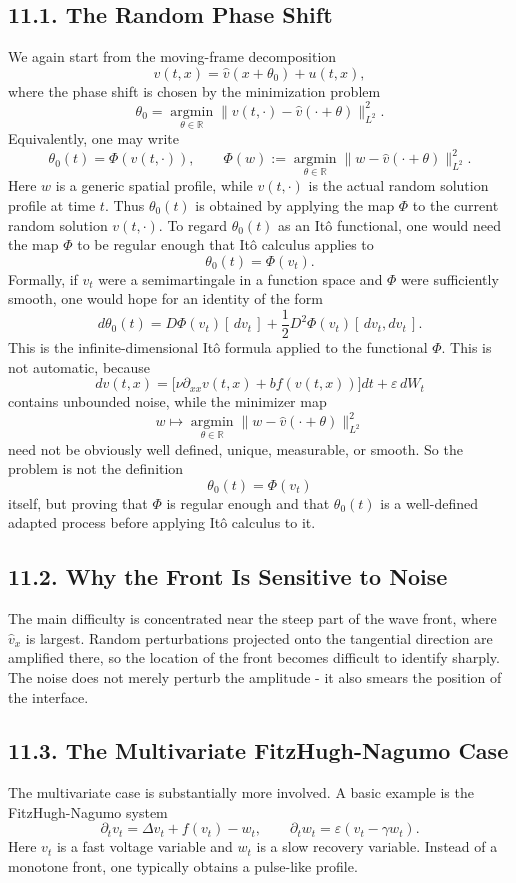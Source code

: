 \documentclass[11pt]{article}
\theoremstyle{definition}
\theoremstyle{remark}
\begin{document}
\subsection*{11.1. The Random Phase Shift}
We again start from the moving-frame decomposition
\[
v(t,x)=\hat v(x+\theta_0)+u(t,x),
\]
where the phase shift is chosen by the minimization problem
\[
\theta_0=\operatorname*{argmin}_{\theta\in\mathbb R}\|v(t,\cdot)-\hat v(\cdot+\theta)\|_{L^2}^2.
\]
Equivalently, one may write
\[
\theta_0(t)=\Phi(v(t,\cdot)),
\qquad
\Phi(w):=\operatorname*{argmin}_{\theta\in\mathbb R}\|w-\hat v(\cdot+\theta)\|_{L^2}^2.
\]
Here $w$ is a generic spatial profile, while $v(t,\cdot)$ is the actual random solution profile at time $t$. Thus $\theta_0(t)$ is obtained by applying the map $\Phi$ to the current random solution $v(t,\cdot)$. To regard $\theta_0(t)$ as an It\^o functional, one would need the map $\Phi$ to be regular enough that It\^o calculus applies to
\[
\theta_0(t)=\Phi(v_t).
\]
Formally, if $v_t$ were a semimartingale in a function space and $\Phi$ were sufficiently smooth, one would hope for an identity of the form
\[
d\theta_0(t)=D\Phi(v_t)[\,dv_t\,]+\frac12 D^2\Phi(v_t)[\,dv_t,dv_t\,].
\]
This is the infinite-dimensional It\^o formula applied to the functional $\Phi$.
This is not automatic, because
\[
dv(t,x)=\bigl[\nu\partial_{xx}v(t,x)+bf(v(t,x))\bigr]dt+\varepsilon\,dW_t
\]
contains unbounded noise, while the minimizer map
\[
w\mapsto \operatorname*{argmin}_{\theta\in\mathbb R}\|w-\hat v(\cdot+\theta)\|_{L^2}^2
\]
need not be obviously well defined, unique, measurable, or smooth. So the problem is not the definition
\[
\theta_0(t)=\Phi(v_t)
\]
itself, but proving that $\Phi$ is regular enough and that $\theta_0(t)$ is a well-defined adapted process before applying It\^o calculus to it.

\subsection*{11.2. Why the Front Is Sensitive to Noise}
The main difficulty is concentrated near the steep part of the wave front, where $\hat v_x$ is largest. Random perturbations projected onto the tangential direction are amplified there, so the location of the front becomes difficult to identify sharply. The noise does not merely perturb the amplitude - it also smears the position of the interface.

\subsection*{11.3. The Multivariate FitzHugh-Nagumo Case}
The multivariate case is substantially more involved. A basic example is the FitzHugh-Nagumo system
\[
\partial_t v_t=\Delta v_t+f(v_t)-w_t,
\qquad
\partial_t w_t=\varepsilon(v_t-\gamma w_t).
\]
Here $v_t$ is a fast voltage variable and $w_t$ is a slow recovery variable. Instead of a monotone front, one typically obtains a pulse-like profile.
\end{document}
